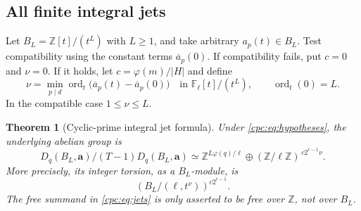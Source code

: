 \documentclass[11pt,a4paper]{article}
\numberwithin{equation}{section}
\newtheorem{theorem}{Theorem}[section]
\theoremstyle{definition}
\theoremstyle{remark}
\begin{document}
\subsection{All finite integral jets}

Let $B_L=\mathbb Z[t]/(t^L)$ with $L\ge1$, and take arbitrary
$a_p(t)\in B_L$. Test compatibility using the constant terms
$\overline a_p(0)$. If compatibility fails, put $c=0$ and
$\nu=0$. If it holds, let $c=\varphi(m)/|H|$ and define
\begin{equation}\label{cpc:eq:contact}
 \nu=\min_{p\mid d}
 \operatorname{ord}_t\bigl(\overline a_p(t)-\overline a_p(0)\bigr)
 \quad\text{in }\mathbb F_\ell[t]/(t^L),
 \qquad\operatorname{ord}_t(0)=L.
\end{equation}
In the compatible case $1\le\nu\le L$.

\begin{theorem}[Cyclic-prime integral jet formula]
\label{cpc:thm:jets}
Under \eqref{cpc:eq:hypotheses}, the underlying abelian group is
\begin{equation}\label{cpc:eq:jets}
 \boxed{\displaystyle
 D_q(B_L,\mathbf a)/(T-1)D_q(B_L,\mathbf a)
 \simeq\mathbb Z^{L\varphi(q)/\ell}
       \oplus(\mathbb Z/\ell\mathbb Z)^{\,c2^{r-1}\nu}.}
\end{equation}
More precisely, its integer torsion, as a $B_L$-module, is
\begin{equation}\label{cpc:eq:jetmodule}
 \left(B_L/(\ell,t^\nu)\right)^{c2^{r-1}}.
\end{equation}
The free summand in \eqref{cpc:eq:jets} is only asserted to be
free over $\mathbb Z$, not over $B_L$.
\end{theorem}
\end{document}
